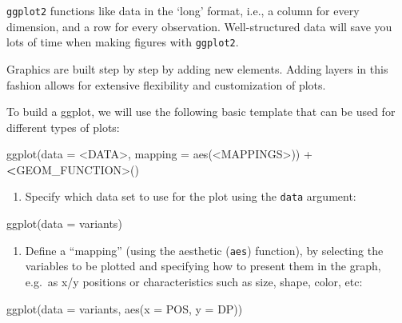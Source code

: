 \documentclass[
]{book}
\newenvironment{Shaded}{\begin{snugshade}}{\end{snugshade}}
\newcommand{\AttributeTok}[1]{\textcolor[rgb]{0.77,0.63,0.00}{#1}}
\newcommand{\ErrorTok}[1]{\textcolor[rgb]{0.64,0.00,0.00}{\textbf{#1}}}
\newcommand{\FunctionTok}[1]{\textcolor[rgb]{0.00,0.00,0.00}{#1}}
\newcommand{\NormalTok}[1]{#1}
\newcommand{\SpecialCharTok}[1]{\textcolor[rgb]{0.00,0.00,0.00}{#1}}
\providecommand{\tightlist}{%
  \setlength{\itemsep}{0pt}\setlength{\parskip}{0pt}}
\begin{document}
\texttt{ggplot2} functions like data in the `long' format, i.e., a column for every dimension, and a row for every observation. Well-structured data will save you lots of time when making figures with \texttt{ggplot2}.

Graphics are built step by step by adding new elements. Adding layers in this fashion allows for extensive flexibility and customization of plots.

To build a ggplot, we will use the following basic template that can be used for different types of plots:

\begin{Shaded}
\begin{Highlighting}[]
\FunctionTok{ggplot}\NormalTok{(}\AttributeTok{data =} \SpecialCharTok{\textless{}}\NormalTok{DATA}\SpecialCharTok{\textgreater{}}\NormalTok{, }\AttributeTok{mapping =} \FunctionTok{aes}\NormalTok{(}\SpecialCharTok{\textless{}}\NormalTok{MAPPINGS}\SpecialCharTok{\textgreater{}}\NormalTok{)) }\SpecialCharTok{+}  \ErrorTok{\textless{}}\NormalTok{GEOM\_FUNCTION}\SpecialCharTok{\textgreater{}}\NormalTok{()}
\end{Highlighting}
\end{Shaded}

\begin{enumerate}
\def\labelenumi{\arabic{enumi}.}
\tightlist
\item
  Specify which data set to use for the plot using the \texttt{data} argument:
\end{enumerate}

\begin{Shaded}
\begin{Highlighting}[]
\FunctionTok{ggplot}\NormalTok{(}\AttributeTok{data =}\NormalTok{ variants)}
\end{Highlighting}
\end{Shaded}

\begin{enumerate}
\def\labelenumi{\arabic{enumi}.}
\setcounter{enumi}{1}
\tightlist
\item
  Define a ``mapping'' (using the aesthetic (\texttt{aes}) function), by selecting the variables to be plotted and specifying how to present them in the graph, e.g.~as x/y positions or characteristics such as size, shape, color, etc:
\end{enumerate}

\begin{Shaded}
\begin{Highlighting}[]
\FunctionTok{ggplot}\NormalTok{(}\AttributeTok{data =}\NormalTok{ variants, }\FunctionTok{aes}\NormalTok{(}\AttributeTok{x =}\NormalTok{ POS, }\AttributeTok{y =}\NormalTok{ DP))}
\end{Highlighting}
\end{Shaded}
\end{document}
